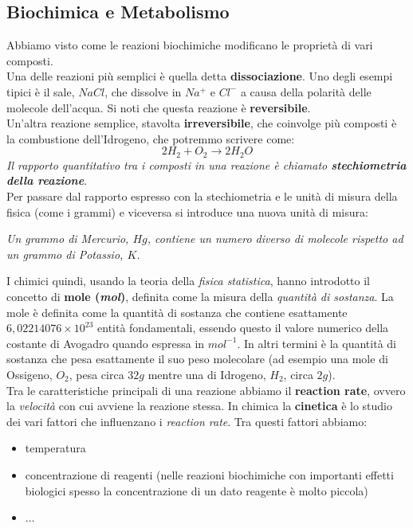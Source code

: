 \documentclass[a4paper,12pt, oneside]{book}
\begin{document}
\subsection{Biochimica e Metabolismo}
Abbiamo visto come le reazioni biochimiche modificano le proprietà di vari
composti. \\
Una delle reazioni più semplici è quella detta \textbf{dissociazione}. Uno degli
esempi tipici è il sale, $NaCl$, che dissolve in $Na^{+}$ e $Cl^{-}$ a causa
della polarità delle molecole dell'acqua. Si noti che questa reazione è
\textbf{reversibile}.\\
Un'altra reazione semplice, stavolta \textbf{irreversibile}, che coinvolge più
composti è la combustione dell'Idrogeno, che potremmo scrivere come:
\[2H_2+O_2\to 2H_2O\]
\textit{Il rapporto quantitativo tra i composti in una reazione è chiamato
  \textbf{stechiometria della reazione}}.\\
Per passare dal rapporto espresso con la stechiometria e le unità di misura
della fisica (come i grammi) e viceversa si introduce una nuova unità di misura:
\begin{center}
  \textit{Un grammo di Mercurio, $Hg$, contiene un numero diverso di molecole 
rispetto ad un grammo di Potassio, $K$.}
\end{center}
I chimici quindi, usando la teoria della \textit{fisica statistica}, hanno
introdotto il concetto di \textbf{mole (\textit{mol})}, definita come la misura
della \textit{quantità di sostanza}. La mole è definita come la quantità di
sostanza che contiene esattamente $6,02214076\times 10^{23}$ entità
fondamentali, essendo questo il valore numerico della costante di Avogadro
quando espressa in $mol^{-1}$. In altri termini è la quantità di sostanza che
pesa esattamente il suo peso molecolare (ad esempio una mole di Ossigeno, $O_2$,
pesa circa $32g$ mentre una di Idrogeno, $H_2$, circa $2g$).\\
Tra le caratteristiche principali di una reazione abbiamo il \textbf{reaction
  rate}, ovvero la \textit{velocità} con cui avviene la reazione stessa. In
chimica la \textbf{cinetica} è lo studio dei vari fattori che influenzano i
\textit{reaction rate}. Tra questi fattori abbiamo:
\begin{itemize}
  \item temperatura
  \item concentrazione di reagenti (nelle reazioni biochimiche con importanti
  effetti biologici spesso la concentrazione di un dato reagente è molto
  piccola) 
  \item $\ldots$
\end{itemize}
\end{document}

